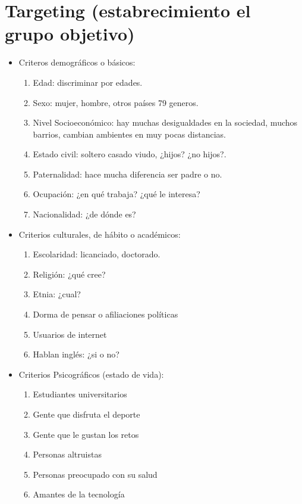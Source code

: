 \section{Targeting (estabrecimiento el grupo objetivo)}
\begin{itemize}
    \item Criteros demográficos o básicos:
        \begin{enumerate}
            \item Edad: discriminar por edades.
            \item Sexo: mujer, hombre, otros países 79 generos.
            \item Nivel Socioeconómico: hay muchas desigualdades en la sociedad, muchos barrios, cambian ambientes en muy pocas distancias.
            \item Estado civil: soltero casado viudo, ¿hijos? ¿no hijos?.
            \item Paternalidad: hace mucha diferencia ser padre o no.
            \item Ocupación: ¿en qué trabaja? ¿qué le interesa?
            \item Nacionalidad: ¿de dónde es?
        \end{enumerate}
    
    \item Criterios culturales, de hábito o académicos: 
        \begin{enumerate}
            \item Escolaridad: licanciado, doctorado.
            \item Religión: ¿qué cree? 
            \item Etnia: ¿cual?
            \item Dorma de pensar o afiliaciones políticas 
            \item Usuarios de internet
            \item Hablan inglés: ¿si o no?
        \end{enumerate}

    \item Criterios Psicográficos (estado de vida):
        \begin{enumerate}
            \item Estudiantes universitarios
            \item Gente que disfruta el deporte 
            \item Gente que le gustan los retos 
            \item Personas altruistas 
            \item Personas preocupado con su salud 
            \item Amantes de la tecnología
        \end{enumerate}
\end{itemize}
